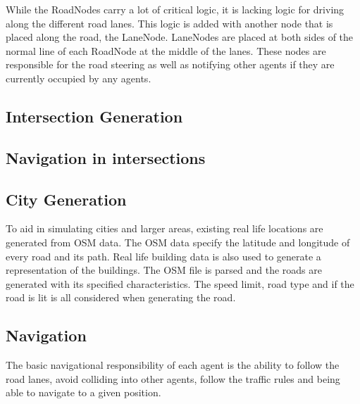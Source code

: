 

    While the RoadNodes carry a lot of critical logic, it is lacking logic for driving along the different road lanes. This logic is added with another node that is placed along the road, the LaneNode. LaneNodes are placed at both sides of the normal line of each RoadNode at the middle of the lanes. These nodes are responsible for the road steering as well as notifying other agents if they are currently occupied by any agents.


\subsection{Intersection Generation}

\subsection{Navigation in intersections}

\subsection{City Generation}
    To aid in simulating cities and larger areas, existing real life locations are generated from OSM data. The OSM data specify the latitude and longitude of every road and its path. Real life building data is also used to generate a representation of the buildings. The OSM file is parsed and the roads are generated with its specified characteristics. The speed limit, road type and if the road is lit is all considered when generating the road.  

\subsection{Navigation}
    The basic navigational responsibility of each agent is the ability to follow the road lanes, avoid colliding into other agents, follow the traffic rules and being able to navigate to a given position.

